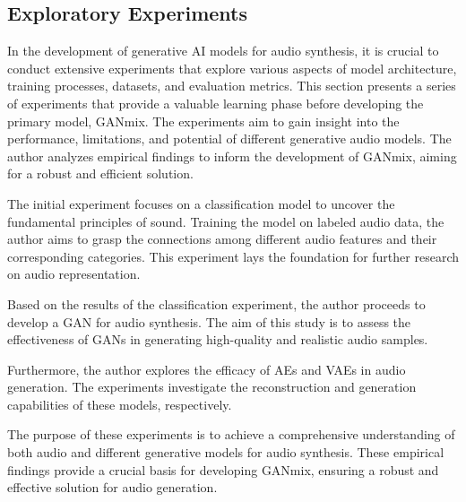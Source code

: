\subsection{Exploratory Experiments} \label{sec:findings}

In the development of generative \ac{AI} models for audio synthesis, it is crucial to conduct extensive experiments that explore various aspects of model architecture, training processes, datasets, and evaluation metrics. This section presents a series of experiments that provide a valuable learning phase before developing the primary model, GANmix. The experiments aim to gain insight into the performance, limitations, and potential of different generative audio models. The author analyzes empirical findings to inform the development of GANmix, aiming for a robust and efficient solution.

The initial experiment focuses on a classification model to uncover the fundamental principles of sound. Training the model on labeled audio data, the author aims to grasp the connections among different audio features and their corresponding categories. This experiment lays the foundation for further research on audio representation.

Based on the results of the classification experiment, the author proceeds to develop a \ac{GAN} for audio synthesis. The aim of this study is to assess the effectiveness of \acp{GAN} in generating high-quality and realistic audio samples.

Furthermore, the author explores the efficacy of \acp{AE} and \acp{VAE} in audio generation. The experiments investigate the reconstruction and generation capabilities of these models, respectively.

The purpose of these experiments is to achieve a comprehensive understanding of both audio and different generative models for audio synthesis. These empirical findings provide a crucial basis for developing GANmix, ensuring a robust and effective solution for audio generation.





